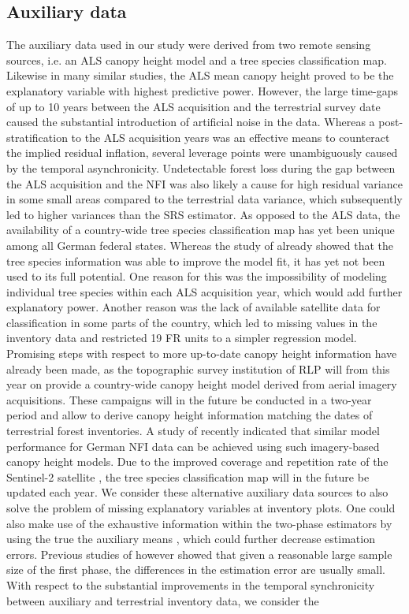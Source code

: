 \subsection{Auxiliary data}

The auxiliary data used in our study were derived from two remote sensing sources, i.e. an ALS canopy height model and a tree species classification map. Likewise in many similar studies, the ALS mean canopy height proved to be the explanatory variable with highest predictive power. However, the large time-gaps of up to 10 years between the ALS acquisition and the terrestrial survey date caused the substantial introduction of artificial noise in the data. Whereas a post-stratification to the ALS acquisition years was an effective means to counteract the implied residual inflation, several leverage points were unambiguously caused by the temporal asynchronicity. Undetectable forest loss during the gap between the ALS acquisition and the NFI was also likely a cause for high residual variance in some small areas compared to the terrestrial data variance, which subsequently led to higher variances than the SRS estimator. As opposed to the ALS data, the availability of a country-wide tree species classification map has yet been unique among all German federal states. Whereas the study of \citet{hill2017a} already showed that the tree species information was able to improve the model fit, it has yet not been used to its full potential. One reason for this was the impossibility of modeling individual tree species within each ALS acquisition year, which would add further explanatory power. Another reason was the lack of available satellite data for classification in some parts of the country, which led to missing values in the inventory data and restricted 19 FR units to a simpler regression model. Promising steps with respect to more up-to-date canopy height information have already been made, as the topographic survey institution of RLP will from this year on provide a country-wide canopy height model derived from aerial imagery acquisitions. These campaigns will in the future be conducted in a two-year period and allow to derive canopy height information matching the dates of terrestrial forest inventories. A study of \citet{kirchhoefer2017} recently indicated that similar model performance for German NFI data can be achieved using such imagery-based canopy height models. Due to the improved coverage and repetition rate of the Sentinel-2 satellite \citep{sentinel2}, the tree species classification map will in the future be updated each year. We consider these alternative auxiliary data sources to also solve the problem of missing explanatory variables at inventory plots. One could also make use of the exhaustive information within the two-phase estimators by using the true the auxiliary means \citep{mandallaz2013a, mandallaz2013b}, which could further decrease estimation errors. Previous studies of \citet{mandallaz2013b} however showed that given a reasonable large sample size of the first phase, the differences in the estimation error are usually small. With respect to the substantial improvements in the temporal synchronicity between auxiliary and terrestrial inventory data, we consider the 